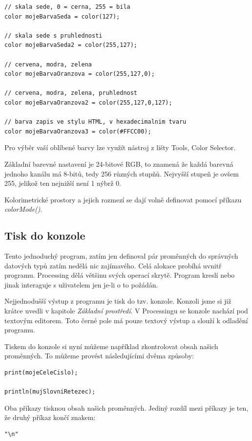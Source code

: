 \documentclass[10pt]{book}
\newcommand{\pododdil}[1]{\subsection{#1}\index{#1}\label{#1}}
\newcommand{\vyraz}[1]{\textit{\gls{#1}}\index{#1}\label{#1}}
\begin{document}
\begin{lstlisting}
// skala sede, 0 = cerna, 255 = bila
color mojeBarvaSeda = color(127);

// skala sede s pruhlednosti
color mojeBarvaSeda2 = color(255,127);

// cervena, modra, zelena
color mojeBarvaOranzova = color(255,127,0);
   
// cervena, modra, zelena, pruhlednost 
color mojeBarvaOranzova2 = color(255,127,0,127);
   
// barva zapis ve stylu HTML, v hexadecimalnim tvaru
color mojeBarvaOranzova3 = color(#FFCC00);
\end{lstlisting}

Pro výběr vaší oblíbené barvy lze využít nástroj z lišty Tools, Color Selector.

Základní barevné nastavení je 24-bitové RGB, to znamená že každá barevná jednoho kanálu má 8-bitů, tedy 256 různých stupňů. Nejvyšší stupeň je ovšem 255, jelikož ten nejnižší není 1 nýbrž 0.

Kolorimetrické prostory a jejich rozmezí se dají volně definovat pomocí příkazu \vyraz{colorMode()}.


\pododdil{Tisk do konzole}

Tento jednoduchý program, zatím jen definoval pár proměnných do správných datových typů zatím nedělá nic zajímavého. Celá alokace probíhá uvnitř programu. Processing dělá většinu svých operací skrytě. Program kreslí nebo jinak interaguje s uživatelem jen je-li o to požádán.

Nejjednodušší výstup z programu je tisk do tzv. konzole. Konzoli jsme si již krátce uvedli v kapitole {\em Základní prostředí}. V Processingu se konzole nachází pod textovým editorem. Toto černé pole má pouze textový výstup a slouží k odladění programu.

Tiskem do konzole si nyní můžeme například zkontrolovat obsah našich proměnných. To můžeme provést následujícími dvěma způsoby:


\begin{lstlisting}
print(mojeCeleCislo);

println(mujSlovniRetezec);
\end{lstlisting}

Oba příkazy tisknou obsah našich proměnných. Jediný rozdíl mezi příkazy je ten, že druhý příkaz končí znakem:
 
\begin{lstlisting}
"\n"
\end{lstlisting}
\end{document}
